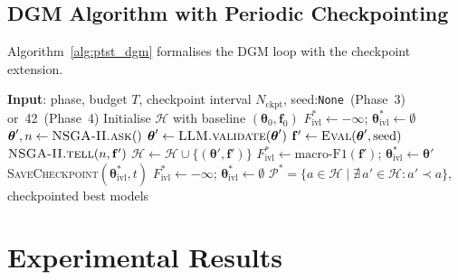 ﻿\documentclass[twocolumn]{article}
\begin{document}
\subsection{DGM Algorithm with Periodic Checkpointing}
\label{subsec:algo}

Algorithm~\ref{alg:ptst_dgm} formalises the DGM loop with the
checkpoint extension.

\begin{algorithm}
\caption{Phased Multi-Objective PatchTST DGM with Checkpointing}
\label{alg:ptst_dgm}
\small
\begin{algorithmic}[1]
\State \textbf{Input}: phase, budget $T$, checkpoint interval
       $N_\text{ckpt}$, seed:\texttt{None}~(Phase~3) or~42~(Phase~4)
\State Initialise $\mathcal{H}$ with baseline
       $(\boldsymbol{\theta}_0, \mathbf{f}_0)$
\State $F^*_\text{ivl} \gets -\infty$;
       $\boldsymbol{\theta}^*_\text{ivl} \gets \emptyset$
  \State $\boldsymbol{\theta}', n \gets \textsc{NSGA-II.ask}()$
  \State $\boldsymbol{\theta}' \gets \textsc{LLM.validate}(\boldsymbol{\theta}')$
  \State $\mathbf{f}' \gets \textsc{Eval}(\boldsymbol{\theta}', \text{seed})$
  \State $\textsc{NSGA-II.tell}(n, \mathbf{f}')$
    \State $\mathcal{H} \gets \mathcal{H} \cup \{(\boldsymbol{\theta}',\mathbf{f}')\}$
  \EndIf
    \State $F^*_\text{ivl} \gets \text{macro-F1}(\mathbf{f}')$;
           $\boldsymbol{\theta}^*_\text{ivl} \gets \boldsymbol{\theta}'$
  \EndIf
    \State \textsc{SaveCheckpoint}$(\boldsymbol{\theta}^*_\text{ivl}, t)$
    \State $F^*_\text{ivl} \gets -\infty$;
           $\boldsymbol{\theta}^*_\text{ivl} \gets \emptyset$
  \EndIf
\EndFor
\State \Return $\mathcal{P}^* = \{a \in \mathcal{H} \mid
       \nexists\, a' \in \mathcal{H}: a' \prec a\}$,
       checkpointed best models
\end{algorithmic}
\end{algorithm}

\section{Experimental Results}
\label{sec:setup}
\end{document}
